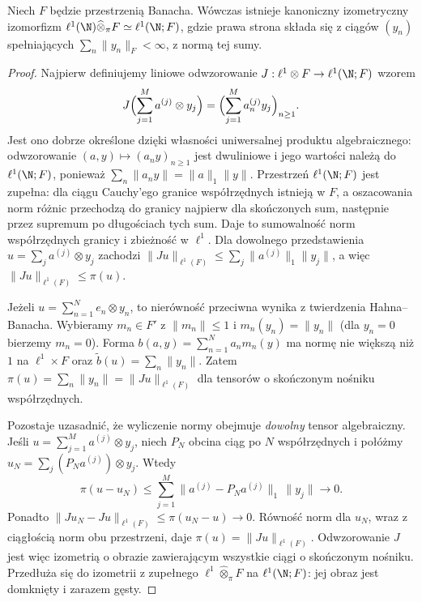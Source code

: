 \begin{twierdzenie}
\label{thm:l1-tensor24}
Niech $F$ będzie przestrzenią Banacha. Wówczas istnieje
kanoniczny izometryczny izomorfizm
$\ell^1(\N)\widehat\otimes_\pi F\simeq\ell^1(\N;F)$,
gdzie prawa strona składa się z ciągów $(y_n)$ spełniających
$\sum_n\|y_n\|_F<\infty$, z normą tej sumy.
\end{twierdzenie}
\begin{proof}
Najpierw definiujemy liniowe odwzorowanie
$J:\ell^1\otimes F\to\ell^1(\N;F)$ wzorem
\[
 J\Bigl(\sum_{j=1}^M a^{(j)}\otimes y_j\Bigr)
 =\Bigl(\sum_{j=1}^M a_n^{(j)}y_j\Bigr)_{n\ge1}.
\]
Jest ono dobrze określone dzięki własności uniwersalnej
produktu algebraicznego: odwzorowanie
$(a,y)\mapsto(a_ny)_{n\ge1}$ jest dwuliniowe i jego
wartości należą do $\ell^1(\N;F)$, ponieważ
$\sum_n\|a_n y\|=\|a\|_1\|y\|$.
Przestrzeń $\ell^1(\N;F)$ jest zupełna: dla ciągu
Cauchy'ego granice współrzędnych istnieją w $F$,
a oszacowania norm różnic przechodzą do granicy
najpierw dla skończonych sum, następnie przez
supremum po długościach tych sum. Daje to
sumowalność norm współrzędnych granicy i zbieżność w $\ell^1$.
Dla dowolnego przedstawienia
$u=\sum_j a^{(j)}\otimes y_j$ zachodzi
$\|Ju\|_{\ell^1(F)}\le\sum_j\|a^{(j)}\|_1\|y_j\|$,
a więc $\|Ju\|_{\ell^1(F)}\le\pi(u)$.

Jeżeli $u=\sum_{n=1}^N e_n\otimes y_n$, to nierówność
przeciwna wynika z twierdzenia Hahna--Banacha.
Wybieramy $m_n\in F'$ z $\|m_n\|\le1$ i
$m_n(y_n)=\|y_n\|$ (dla $y_n=0$ bierzemy $m_n=0$).
Forma $b(a,y)=\sum_{n=1}^Na_nm_n(y)$ ma normę
nie większą niż $1$ na $\ell^1\times F$ oraz
$\widetilde b(u)=\sum_n\|y_n\|$. Zatem
$\pi(u)=\sum_n\|y_n\|=\|Ju\|_{\ell^1(F)}$
dla tensorów o skończonym nośniku współrzędnych.

Pozostaje uzasadnić, że wyliczenie normy obejmuje
\emph{dowolny} tensor algebraiczny. Jeśli
$u=\sum_{j=1}^M a^{(j)}\otimes y_j$, niech $P_N$
obcina ciąg po $N$ współrzędnych i połóżmy
$u_N=\sum_j(P_Na^{(j)})\otimes y_j$. Wtedy
\[
 \pi(u-u_N)\le\sum_{j=1}^M
 \|a^{(j)}-P_Na^{(j)}\|_1\,\|y_j\|\longrightarrow0.
\]
Ponadto $\|Ju_N-Ju\|_{\ell^1(F)}\le\pi(u_N-u)\to0$. Równość
norm dla $u_N$, wraz z ciągłością norm obu przestrzeni,
daje $\pi(u)=\|Ju\|_{\ell^1(F)}$.
Odwzorowanie $J$ jest więc izometrią o obrazie
zawierającym wszystkie ciągi o skończonym nośniku.
Przedłuża się do izometrii z zupełnego
$\ell^1\widehat\otimes_\pi F$ na $\ell^1(\N;F)$:
jej obraz jest domknięty i zarazem gęsty.
\end{proof}

